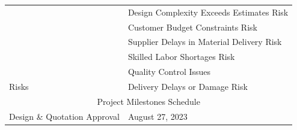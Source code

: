 \begin{table}[!h]
{\begin{tabular}{|llll|}
            \multicolumn{1}{|l|}{}                                                        & \multicolumn{3}{l|}{Design Complexity Exceeds Estimates Risk}                                                                                                                                             \\ \cline{2-4}
            \multicolumn{1}{|l|}{}                                                        & \multicolumn{3}{l|}{Customer Budget Constraints Risk}                                                                                                                                                     \\ \cline{2-4}
            \multicolumn{1}{|l|}{}                                                        & \multicolumn{3}{l|}{Supplier Delays in Material Delivery Risk}                                                                                                                                            \\ \cline{2-4}
            \multicolumn{1}{|l|}{}                                                        & \multicolumn{3}{l|}{Skilled Labor Shortages Risk}                                                                                                                                                         \\ \cline{2-4}
            \multicolumn{1}{|l|}{}                                                        & \multicolumn{3}{l|}{Quality Control Issues}                                                                                                                                                               \\ \cline{2-4}
            \multicolumn{1}{|l|}{\multirow{-8}{*}{Risks}}                                 & \multicolumn{3}{l|}{Delivery Delays or Damage Risk}                                                                                                                                                       \\ \hline
            \multicolumn{4}{|c|}{\cellcolor[HTML]{96FFFB}Project Milestones Schedule}                                                                                                                                                                                                                 \\ \hline
            \multicolumn{1}{|l|}{Design \& Quotation Approval}                            & \multicolumn{3}{l|}{August 27, 2023}                                                                                                                                                                      \\ \hline

\end{tabular}}
\end{table}
